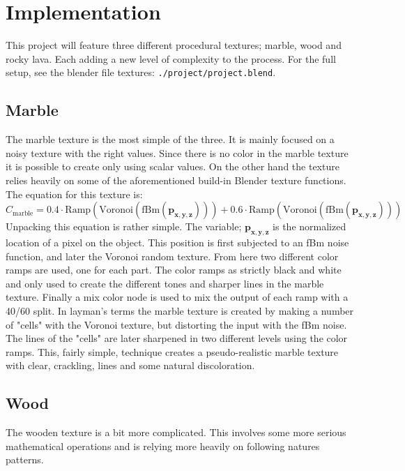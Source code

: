 \documentclass[a4paper, 12pt]{olplainarticle}
\begin{document}
\section{Implementation}
This project will feature three different procedural textures; marble, wood and rocky lava. Each adding a new level of complexity to the process.
For the full setup, see the blender file textures: \texttt{./project/project.blend}.

\subsection{Marble}
The marble texture is the most simple of the three. It is mainly focused on a noisy texture with the right values. 
Since there is no color in the marble texture it is possible to create only using scalar values. 
On the other hand the texture relies heavily on some of the aforementioned build-in Blender texture functions.
The equation for this texture is:
$$
    C_{\text{marble}} =
    0.4 \cdot \text{Ramp}(\text{Voronoi}(\text{fBm}(\mathbf{p_{x,y,z}}))) + 0.6 \cdot \text{Ramp}(\text{Voronoi}(\text{fBm}(\mathbf{p_{x,y, z}})))
$$
Unpacking this equation is rather simple. The variable; $\mathbf{p_{x,y,z}}$ is the normalized location of a pixel on the object.
This position is first subjected to an fBm noise function, and later the Voronoi random texture. From here two different color ramps are used, one for each part.
The color ramps as strictly black and white and only used to create the different tones and sharper lines in the marble texture. 
Finally a mix color node is used to mix the output of each ramp with a 40/60 split. 
In layman's terms the marble texture is created by making a number of "cells" with the Voronoi texture, but distorting the input with the fBm noise. 
The lines of the "cells" are later sharpened in two different levels using the color ramps.
This, fairly simple, technique creates a pseudo-realistic marble texture with clear, crackling, lines and some natural discoloration.

\subsection{Wood}
The wooden texture is a bit more complicated. This involves some more serious mathematical operations and is relying more heavily on following natures patterns.
\end{document}
